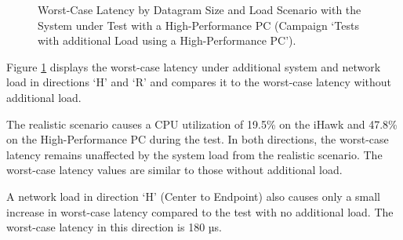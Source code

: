 \begin{figure}[h!]
  \centering
  \caption{Worst-Case Latency by Datagram Size and Load Scenario with the System under Test with a High-Performance PC (Campaign `Tests with additional Load using a High-Performance PC').}
  \label{fig:StressWc}
\end{figure}

Figure \ref{fig:StressWc} displays the worst-case latency under additional system and network load in directions `H' and `R' and compares it to the worst-case latency without additional load.

The realistic scenario causes a \ac{CPU} utilization of 19.5\% on the iHawk and 47.8\% on the High-Performance PC during the test. In both directions, the worst-case latency remains unaffected by the system load from the realistic scenario. The worst-case latency values are similar to those without additional load.

A network load in direction `H' (Center to Endpoint) also causes only a small increase in worst-case latency compared to the test with no additional load. The worst-case latency in this direction is 180 µs.

